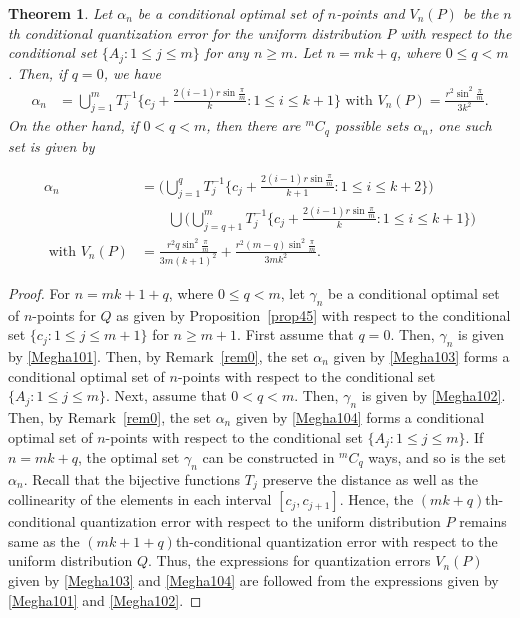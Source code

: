 \documentclass[12pt, reqno]{amsart}
\theoremstyle{plain}
\newtheorem{theorem}[subsection]{Theorem}
\theoremstyle{definition}
\newcommand{\UU}{\bigcup}%
\newcommand{\set}[1]{\{#1\}}%
\newcommand{\ga}{\alpha}
\renewcommand{\gg}{\gamma}%
\newcommand{\te}{\text}%
\begin{document}
\begin{theorem} \label{theMe0}
Let $\ga_n$ be a conditional optimal set of $n$-points and $V_n(P)$ be the $n$th conditional quantization error for the uniform distribution $P$ with respect to the conditional set $\set{A_j : 1\leq j\leq m}$ for any $n\geq m$. Let $n=m k +q$, where $0\leq q< m$. Then, if $q=0$,  
we have 
\begin{align} \label{Megha103} 
\ga_n& = \UU_{j=1}^{m}T_j^{-1}\{c_j+\frac{2(i-1)r\sin \frac{\pi}m}{k}  : 1\leq i\leq k+1\}  \te{ with } V_n(P)=\frac {r^2 \sin^2\frac{\pi} m}{3k^2}.
\end{align} 
On the other hand, if $0<q<m$, then there are $^mC_q$ possible sets $\ga_n$, one such set is given by 

\begin{equation} \label{Megha104} 
\begin{aligned}  \ga_n & = \Big(\UU_{j=1}^{q}T_j^{-1}\{c_j+\frac{2(i-1)r\sin \frac{\pi}m}{k+1} : 1\leq i\leq k+2\}\Big)\\
&\qquad \UU \Big(\UU_{j=q+1}^{m}T_j^{-1}\{c_j+\frac{2(i-1)r\sin \frac{\pi}m}{k}  : 1\leq i\leq k+1\}\Big) \\
\te{ with } V_n(P)&=\frac {r^2q\sin^2\frac{\pi} m}{3m(k+1)^2}+ \frac {r^2(m-q)\sin^2\frac{\pi} m}{3mk^2}.
\end{aligned} 
\end{equation} 
 \end{theorem} 
\begin{proof}
For $n=mk+1+q$, where $0\leq q<m$, let $\gg_n$ be a conditional optimal set of $n$-points for $Q$ as given by Proposition~\ref{prop45} with respect to the conditional set $\set{c_j : 1\leq j\leq m+1}$ for $n\geq m+1$. First assume that $q=0$. Then, $\gg_n$ is given by \eqref{Megha101}. Then, by Remark~\ref{rem0}, the set $\ga_n$ given by \eqref{Megha103} forms a conditional optimal set of $n$-points  with respect to the conditional set $\set{A_j : 1\leq j\leq m}$.  Next, assume that $0<q<m$. Then, $\gg_n$ is given by \eqref{Megha102}. Then, by Remark~\ref{rem0}, the set $\ga_n$ given by \eqref{Megha104} forms a conditional optimal set of $n$-points  with respect to the conditional set $\set{A_j : 1\leq j\leq m}$. If $n=mk+q$, the optimal set $\gg_n$ can be constructed in $^mC_q$ ways, and so is the set $\ga_n$.
Recall that the bijective functions $T_j$ preserve the distance as well as the collinearity of the elements in each interval $[c_j, c_{j+1}]$. Hence, the $(mk+q)$th-conditional quantization error with respect to the uniform distribution $P$ remains same as the $(mk+1+q)$th-conditional quantization error with respect to the uniform distribution $Q$. Thus, the expressions for quantization errors $V_n(P)$ given by \eqref{Megha103} and \eqref{Megha104} are followed from the expressions given by \eqref{Megha101} and \eqref{Megha102}. 
\end{proof} 
\end{document}
